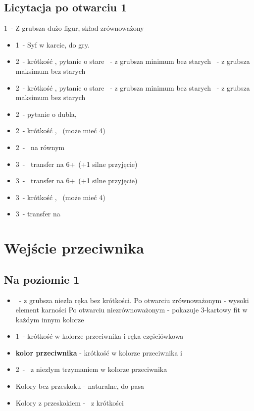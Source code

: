 \documentclass[12pt, a4paper]{article}
\begin{document}
\subsection{Licytacja po otwarciu 1\spades}
\begin{formal}
    1\spades\ - Z grubsza dużo figur, skład zrównoważony
\end{formal}
\begin{itemize}
    \item 1\nt\ - Syf w karcie, do gry.
    \item 2\clubs\ - krótkość \clubs, pytanie o stare
    \diams\ - z grubsza minimum bez starych
    \nt\ - z grubsza maksimum bez starych
    \item 2\diams\ - krótkość \diams, pytanie o stare
    \nt\ - z grubsza minimum bez starych
    \clubs\ - z grubsza maksimum bez starych
    \item 2\hearts\ - pytanie o dubla, \gf
    \item 2\spades\ - krótkość \spades, \gf\ (może mieć 4\hearts)
    \item 2\nt\ - \gf\ na równym
    \item 3\clubs\ - \gf\ transfer na 6+\hearts\ (+1 silne przyjęcie)
    \item 3\diams\ - \gf\ transfer na 6+\spades\ (+1 silne przyjęcie)
    \item 3\hearts\ - krótkość \hearts, \gf\ (może mieć 4\spades)
    \item 3\spades\ - transfer na \nt
\end{itemize}

\pagebreak
\section{Wejście przeciwnika}
\subsection{Na poziomie 1}
\begin{itemize}
    \item \dbl\ - z grubsza niezła ręka bez krótkości.
    \subitem Po otwarciu zrównoważonym - wysoki element karności
    \subitem Po otwarciu niezrównoważonym - pokazuje 3-kartowy fit w każdym innym kolorze
    \item 1\nt\ - krótkość w kolorze przeciwnika i ręka częściówkowa
    \item \textbf{kolor przeciwnika} - krótkość w kolorze przeciwnika i \gf
    \item 2\nt\ - \gf\ z niezłym trzymaniem w kolorze przeciwnika
    \item Kolory bez przeskoku - naturalne, do pasa
    \item Kolory z przeskokiem - \gf\ z krótkości
\end{itemize}
\end{document}
